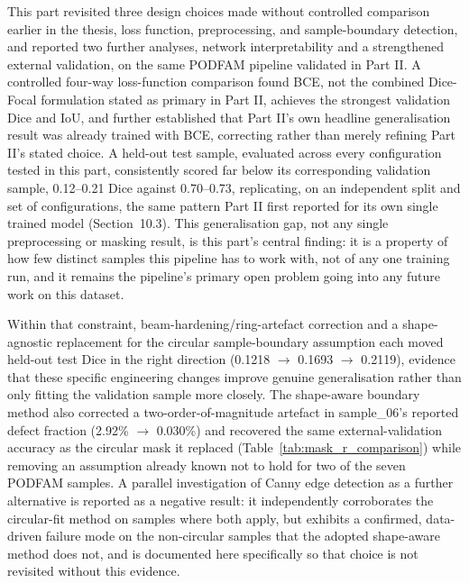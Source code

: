 
This part revisited three design choices made without controlled comparison earlier in the thesis,
loss function, preprocessing, and sample-boundary detection, and reported two further analyses,
network interpretability and a strengthened external validation, on the same PODFAM pipeline validated
in Part II. A controlled four-way loss-function comparison found BCE, not the combined Dice-Focal
formulation stated as primary in Part II, achieves the strongest validation Dice and IoU, and further
established that Part II's own headline generalisation result was already trained with BCE, correcting
rather than merely refining Part II's stated choice. A held-out test sample, evaluated across every
configuration tested in this part, consistently scored far below its corresponding validation sample,
0.12--0.21 Dice against 0.70--0.73, replicating, on an independent split and set of configurations, the
same pattern Part II first reported for its own single trained model (Section~10.3). This
generalisation gap, not any single preprocessing or masking result, is this part's central finding: it
is a property of how few distinct samples this pipeline has to work with, not of any one training run,
and it remains the pipeline's primary open problem going into any future work on this dataset.

Within that constraint, beam-hardening/ring-artefact correction and a shape-agnostic replacement for
the circular sample-boundary assumption each moved held-out test Dice in the right direction (0.1218
$\to$ 0.1693 $\to$ 0.2119), evidence that these specific engineering changes improve genuine
generalisation rather than only fitting the validation sample more closely. The shape-aware boundary
method also corrected a two-order-of-magnitude artefact in sample\_06's reported defect fraction
(2.92\% $\to$ 0.030\%) and recovered the same external-validation accuracy as the circular mask it
replaced (Table~\ref{tab:mask_r_comparison}) while removing an assumption already known not to hold for
two of the seven PODFAM samples. A parallel investigation of Canny edge detection as a further
alternative is reported as a negative result: it independently corroborates the circular-fit method on
samples where both apply, but exhibits a confirmed, data-driven failure mode on the non-circular
samples that the adopted shape-aware method does not, and is documented here specifically so that
choice is not revisited without this evidence.

